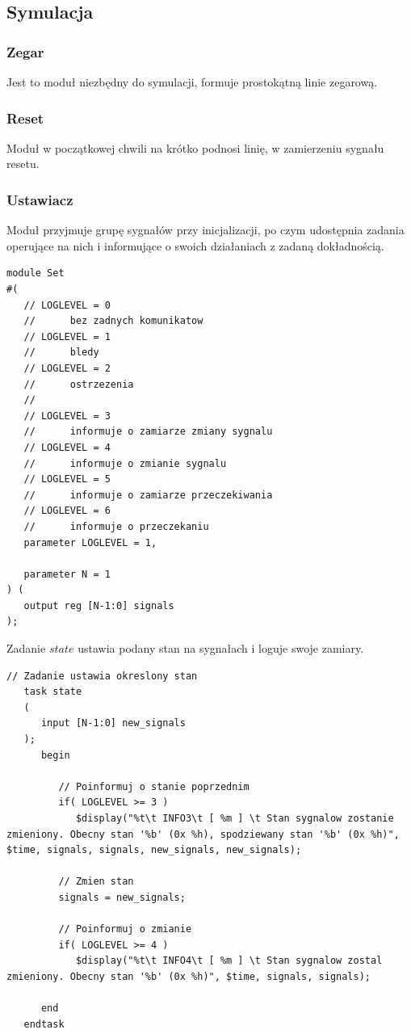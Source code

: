 \documentclass[a4paper,12pt]{article}
\begin{document}
\subsection{Symulacja}

\subsubsection{Zegar}
Jest to moduł niezbędny do symulacji, formuje prostokątną linie zegarową.


\subsubsection{Reset}
Moduł w początkowej chwili na krótko podnosi linię, w zamierzeniu sygnału resetu.


\subsubsection{Ustawiacz}
Moduł przyjmuje grupę sygnałów przy inicjalizacji, po czym udostępnia zadania operujące na nich i informujące o swoich działaniach z zadaną dokładnością.
\begin{lstlisting}[label=Set,caption=Set.v]
module Set
#(
   // LOGLEVEL = 0
   //      bez zadnych komunikatow
   // LOGLEVEL = 1
   //      bledy
   // LOGLEVEL = 2
   //      ostrzezenia
   //
   // LOGLEVEL = 3
   //      informuje o zamiarze zmiany sygnalu
   // LOGLEVEL = 4
   //      informuje o zmianie sygnalu
   // LOGLEVEL = 5
   //      informuje o zamiarze przeczekiwania
   // LOGLEVEL = 6
   //      informuje o przeczekaniu
   parameter LOGLEVEL = 1,

   parameter N = 1
) (
   output reg [N-1:0] signals
);
\end{lstlisting}

Zadanie $state$ ustawia podany stan na sygnałach i loguje swoje zamiary.
\begin{lstlisting}[label=Set,caption=Set.v,firstnumber=25]
   // Zadanie ustawia okreslony stan
   task state
   (
      input [N-1:0] new_signals
   );
      begin

         // Poinformuj o stanie poprzednim
         if( LOGLEVEL >= 3 )
            $display("%t\t INFO3\t [ %m ] \t Stan sygnalow zostanie zmieniony. Obecny stan '%b' (0x %h), spodziewany stan '%b' (0x %h)", $time, signals, signals, new_signals, new_signals);

         // Zmien stan
         signals = new_signals;

         // Poinformuj o zmianie
         if( LOGLEVEL >= 4 )
            $display("%t\t INFO4\t [ %m ] \t Stan sygnalow zostal zmieniony. Obecny stan '%b' (0x %h)", $time, signals, signals);

      end
   endtask
\end{lstlisting}
\end{document}
